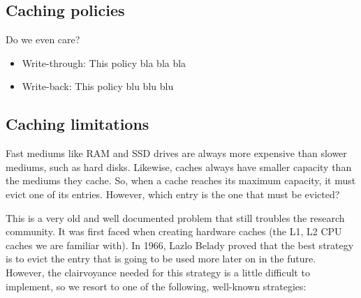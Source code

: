 \subsection{Caching policies}

Do we even care?

\begin{itemize}
	\item Write-through:
		This policy bla bla bla
	\item Write-back:
		This policy blu blu blu
\end{itemize}

\subsection{Caching limitations}

Fast mediums like RAM and SSD drives are always more expensive than slower 
mediums, such as hard disks. Likewise, caches always have smaller capacity than 
the mediums they cache. So, when a cache reaches its maximum capacity, it must 
evict one of its entries. However, which entry is the one that must be evicted?

This is a very old and well documented problem that still troubles the research 
community. It was first faced when creating hardware caches (the L1, L2 CPU 
caches we are familiar with). In 1966, Lazlo Belady proved that the best 
strategy is to evict the entry that is going to be used more later on in the 
future\cite{Belady}.  However, the clairvoyance needed for this strategy is a 
little difficult to implement, so we resort to one of the following, well-known 
strategies:

